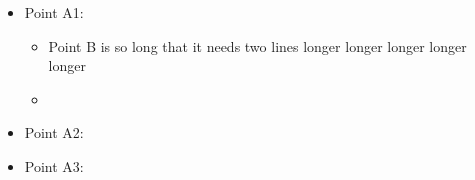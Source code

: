 \documentclass{beamer}
\begin{document}
\begin{frame}
\setlength{\leftmargini}{0.5cm}
\setlength{\leftmarginii}{0.5cm}
        \begin{itemize}

        \item Point A1: 

            \begin{itemize}
                 \item Point B is so long that it needs two lines longer longer longer longer longer 
                 \item 
            \end{itemize}                           

        \item Point A2:

        \item Point A3:         

    \end{itemize}

\end{frame} 
\end{document}
